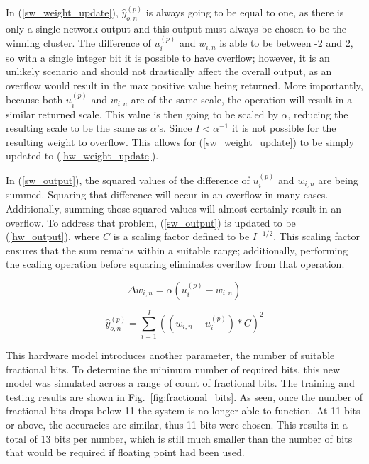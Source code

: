 \documentclass[10pt,journal]{IEEEtran}
\newcommand{\fig}[1]{Fig.~\ref{#1}}
\newcommand{\eq}[1]{(\ref{#1})}
\begin{document}
				In \eq{sw_weight_update}, \(\hat{y}_{o,n}^{(p)}\) is always going to be equal to one, as there is only a single network output and this output must always be chosen to be the winning cluster. The difference of \(u_i^{(p)}\) and \(w_{i,n}\) is able to be between -2 and 2, so with a single integer bit it is possible to have overflow; however, it is an unlikely scenario and should not drastically affect the overall output, as an overflow would result in the max positive value being returned. More importantly, because both \(u_i^{(p)}\) and \(w_{i,n}\) are of the same scale, the operation will result in a similar returned scale. This value is then going to be scaled by \(\alpha\), reducing the resulting scale to be the same as \(\alpha\)'s. Since \(I < \alpha^{-1}\) it is not possible for the resulting weight to overflow. This allows for \eq{sw_weight_update} to be simply updated to \eq{hw_weight_update}.
				
				In \eq{sw_output}, the squared values of the difference of \(u_i^{(p)}\) and \(w_{i,n}\) are being summed. Squaring that difference will occur in an overflow in many cases. Additionally, summing those squared values will almost certainly result in an overflow. To address that problem, \eq{sw_output} is updated to be \eq{hw_output}, where \(C\) is a scaling factor defined to be \(I^{-1/2}\). This scaling factor ensures that the sum remains within a suitable range; additionally, performing the scaling operation before squaring eliminates overflow from that operation.
				
				\begin{equation}
					\label{hw_weight_update}
					\Delta w_{i,n} = \alpha(u_i^{(p)}-w_{i,n})
				\end{equation}
				
				\begin{equation}
					\label{hw_output}
					\hat{y}_{o,n}^{(p)} = \displaystyle\sum_{i=1}^{I}((w_{i,n} - u_i^{(p)})*C)^2
				\end{equation}
				
				This hardware model introduces another parameter, the number of suitable fractional bits. To determine the minimum number of required bits, this new model was simulated across a range of count of fractional bits. The training and testing results are shown in \fig{fig:fractional_bits}. As seen, once the number of fractional bits drops below 11 the system is no longer able to function. At 11 bits or above, the accuracies are similar, thus 11 bits were chosen. This results in a total of 13 bits per number, which is still much smaller than the number of bits that would be required if floating point had been used.
		
\end{document}
